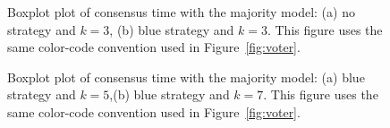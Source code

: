 \documentclass[sigconf]{acmart}
\begin{document}
\begin{figure}
  \hfill
  \caption{Boxplot plot of consensus time  with the majority model: (a)  no strategy and $k=3$, (b) blue strategy and $k=3$. This figure uses the same color-code convention used in Figure~\ref{fig:voter}.}
  \end{figure}
  \begin{figure}
  \hfill
  \caption{Boxplot plot of consensus time  with the majority model: (a) blue strategy and $k=5$,(b) blue strategy and $k=7$. This figure uses the same color-code convention used in Figure~\ref{fig:voter}.}
\end{figure}
\end{document}
